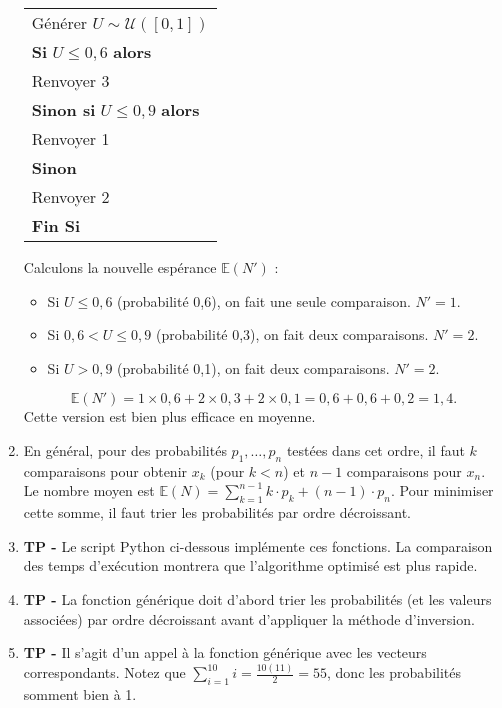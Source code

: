 \documentclass[solutions]{exercices}
\begin{document}
\begin{solution}
\begin{enumerate}
\begin{center}
\begin{tabular}{l}
\hline
Générer $U \sim \mathcal{U}([0,1])$ \\
\textbf{Si} $U \leq 0,6$ \textbf{alors} \\
\hspace{1cm} Renvoyer 3 \\
\textbf{Sinon si} $U \leq 0,9$ \textbf{alors} \\
\hspace{1cm} Renvoyer 1 \\
\textbf{Sinon} \\
\hspace{1cm} Renvoyer 2 \\
\textbf{Fin Si} \\
\hline
\end{tabular}
\end{center}
Calculons la nouvelle espérance $\mathbb{E}(N')$ :
\begin{itemize}
    \item Si $U \leq 0,6$ (probabilité 0,6), on fait une seule comparaison. $N'=1$.
    \item Si $0,6 < U \leq 0,9$ (probabilité 0,3), on fait deux comparaisons. $N'=2$.
    \item Si $U > 0,9$ (probabilité 0,1), on fait deux comparaisons. $N'=2$.
\end{itemize}
\[ \mathbb{E}(N') = 1 \times 0,6 + 2 \times 0,3 + 2 \times 0,1 = 0,6 + 0,6 + 0,2 = 1,4. \]
Cette version est bien plus efficace en moyenne.
\item En général, pour des probabilités $p_1, \dots, p_n$ testées dans cet ordre, il faut $k$ comparaisons pour obtenir $x_k$ (pour $k < n$) et $n-1$ comparaisons pour $x_n$. Le nombre moyen est $\mathbb{E}(N) = \sum_{k=1}^{n-1} k \cdot p_k + (n-1) \cdot p_n$. Pour minimiser cette somme, il faut trier les probabilités par ordre décroissant.
\item \textbf{TP -} Le script Python ci-dessous implémente ces fonctions. La comparaison des temps d'exécution montrera que l'algorithme optimisé est plus rapide.
\item \textbf{TP -} La fonction générique doit d'abord trier les probabilités (et les valeurs associées) par ordre décroissant avant d'appliquer la méthode d'inversion.
\item \textbf{TP -} Il s'agit d'un appel à la fonction générique avec les vecteurs correspondants. Notez que $\sum_{i=1}^{10} i = \frac{10(11)}{2} = 55$, donc les probabilités somment bien à 1.
\end{enumerate}
\end{solution}
\end{document}
